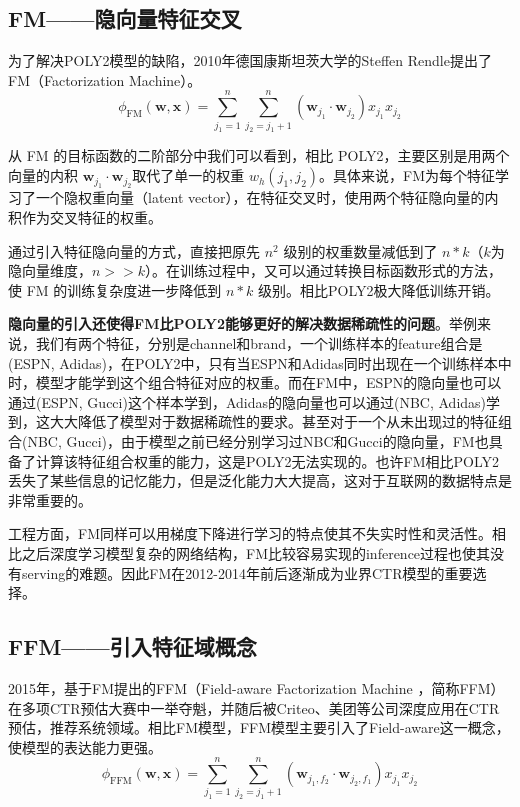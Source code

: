 \documentclass[12pt]{article}
\begin{document}
\subsection{FM——隐向量特征交叉}
为了解决POLY2模型的缺陷，2010年德国康斯坦茨大学的Steffen Rendle提出了FM（Factorization Machine）。
$$
\phi_{\text{FM}}(\mathbf{w}, \mathbf{x}) = \sum_{j_1=1}^n\sum_{j_2 = j_1 + 1}^n (\mathbf{w}_{j_1} \cdot \mathbf{w}_{j_2})x_{j_1}x_{j_2}
$$

从 FM 的目标函数的二阶部分中我们可以看到，相比 POLY2，主要区别是用两个向量的内积 $\mathbf{w}_{j_1} \cdot \mathbf{w}_{j_2}$取代了单一的权重 $w_h(j_1, j_2)$。具体来说，FM为每个特征学习了一个隐权重向量（latent vector），在特征交叉时，使用两个特征隐向量的内积作为交叉特征的权重。

通过引入特征隐向量的方式，直接把原先 $n^2$ 级别的权重数量减低到了 $n*k$（$k$为隐向量维度，$n >> k$）。在训练过程中，又可以通过转换目标函数形式的方法，使 FM 的训练复杂度进一步降低到 $n*k$ 级别。相比POLY2极大降低训练开销。

\textbf{隐向量的引入还使得FM比POLY2能够更好的解决数据稀疏性的问题}。举例来说，我们有两个特征，分别是channel和brand，一个训练样本的feature组合是(ESPN, Adidas)，在POLY2中，只有当ESPN和Adidas同时出现在一个训练样本中时，模型才能学到这个组合特征对应的权重。而在FM中，ESPN的隐向量也可以通过(ESPN, Gucci)这个样本学到，Adidas的隐向量也可以通过(NBC, Adidas)学到，这大大降低了模型对于数据稀疏性的要求。甚至对于一个从未出现过的特征组合(NBC, Gucci)，由于模型之前已经分别学习过NBC和Gucci的隐向量，FM也具备了计算该特征组合权重的能力，这是POLY2无法实现的。也许FM相比POLY2丢失了某些信息的记忆能力，但是泛化能力大大提高，这对于互联网的数据特点是非常重要的。

工程方面，FM同样可以用梯度下降进行学习的特点使其不失实时性和灵活性。相比之后深度学习模型复杂的网络结构，FM比较容易实现的inference过程也使其没有serving的难题。因此FM在2012-2014年前后逐渐成为业界CTR模型的重要选择。

\subsection{FFM——引入特征域概念}
2015年，基于FM提出的FFM（Field-aware Factorization Machine ，简称FFM）在多项CTR预估大赛中一举夺魁，并随后被Criteo、美团等公司深度应用在CTR预估，推荐系统领域。相比FM模型，FFM模型主要引入了Field-aware这一概念，使模型的表达能力更强。
$$
\phi_{\text{FFM}}(\mathbf{w}, \mathbf{x}) = \sum_{j_1=1}^n\sum_{j_2 = j_1 + 1}^n (\mathbf{w}_{j_1, f_2} \cdot \mathbf{w}_{j_2, f_1})x_{j_1}x_{j_2}
$$
\end{document}
